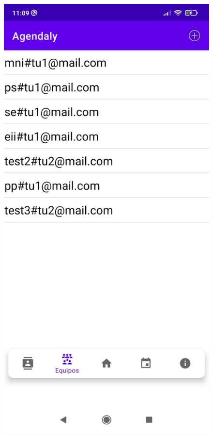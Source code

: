 \documentclass[a4paper,openright,12pt]{article}
\begin{document}
\begin{figure}
    \includegraphics[scale=0.05]{teams_view.jpeg}\hfill

\end{figure}
\end{document}
